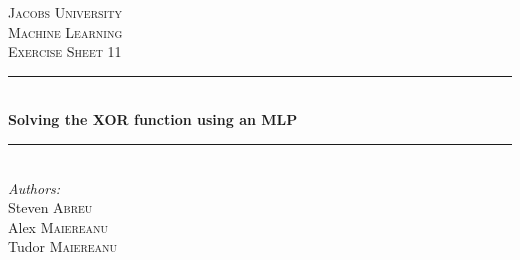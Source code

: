 \documentclass[12pt]{article}
\begin{document}
\begin{titlepage}

\newcommand{\HRule}{\rule{\linewidth}{0.4mm}} 

\center 
 

\textsc{\LARGE Jacobs University}\\[1.5cm] %
\textsc{\Large Machine Learning}\\[0.5cm] %
\textsc{\large Exercise Sheet 11}\\[0.5cm] %


\HRule \\[0.4cm]
{ \huge \bfseries Solving the XOR function using an MLP}\\[0.4cm] %
\HRule \\[1.5cm]
 


\Large \emph{Authors:}\\
Steven \textsc{Abreu}\\
Alex \textsc{Maiereanu}\\
Tudor \textsc{Maiereanu}\\[3cm] %


\end{titlepage}
\end{document}
